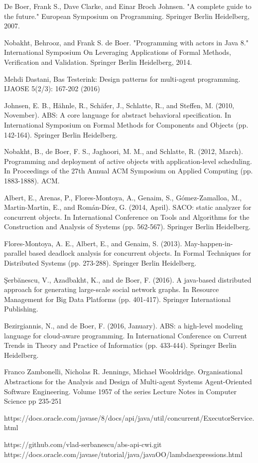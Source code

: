 \documentclass[runningheads,a4paper]{llncs}
\begin{document}
\begin{thebibliography}{4}
		De Boer, Frank S., Dave Clarke, and Einar Broch Johnsen. "A complete guide to the future." European Symposium on Programming. Springer Berlin Heidelberg, 2007.
		
		 Nobakht, Behrooz, and Frank S. de Boer. "Programming with actors in Java 8." International Symposium On Leveraging Applications of Formal Methods, Verification and Validation. Springer Berlin Heidelberg, 2014.
		
		 Mehdi Dastani, Bas Testerink:
		Design patterns for multi-agent programming. IJAOSE 5(2/3): 167-202 (2016)
		
		 Johnsen, E. B., Hähnle, R., Schäfer, J., Schlatte, R., and Steffen, M. (2010, November). ABS: A core language for abstract behavioral specification. In International Symposium on Formal Methods for Components and Objects (pp. 142-164). Springer Berlin Heidelberg.
		
		 Nobakht, B., de Boer, F. S., Jaghoori, M. M., and Schlatte, R. (2012, March). Programming and deployment of active objects with application-level scheduling. In Proceedings of the 27th Annual ACM Symposium on Applied Computing (pp. 1883-1888). ACM.
		
		 Albert, E., Arenas, P., Flores-Montoya, A., Genaim, S., Gómez-Zamalloa, M., Martin-Martin, E., and Román-Díez, G. (2014, April). SACO: static analyzer for concurrent objects. In International Conference on Tools and Algorithms for the Construction and Analysis of Systems (pp. 562-567). Springer Berlin Heidelberg.
		
		Flores-Montoya, A. E., Albert, E., and Genaim, S. (2013). May-happen-in-parallel based deadlock analysis for concurrent objects. In Formal Techniques for Distributed Systems (pp. 273-288). Springer Berlin Heidelberg.
		
		Şerbănescu, V., Azadbakht, K., and de Boer, F. (2016). A java-based distributed approach for generating large-scale social network graphs. In Resource Management for Big Data Platforms (pp. 401-417). Springer International Publishing.
		
		 Bezirgiannis, N., and de Boer, F. (2016, January). ABS: a high-level modeling language for cloud-aware programming. In International Conference on Current Trends in Theory and Practice of Informatics (pp. 433-444). Springer Berlin Heidelberg.
		
		Franco Zambonelli, Nicholas R. Jennings, Michael Wooldridge. 
		Organisational Abstractions for the Analysis and Design of Multi-agent Systems
		Agent-Oriented Software Engineering. Volume 1957 of the series Lecture Notes in Computer Science pp 235-251
		
		 https://docs.oracle.com/javase/8/docs/api/java/util/concurrent/ExecutorService.html
		
		https://github.com/vlad-serbanescu/abs-api-cwi.git
		 https://docs.oracle.com/javase/tutorial/java/javaOO/lambdaexpressions.html
	\end{thebibliography}
	
	
	
\end{document}

